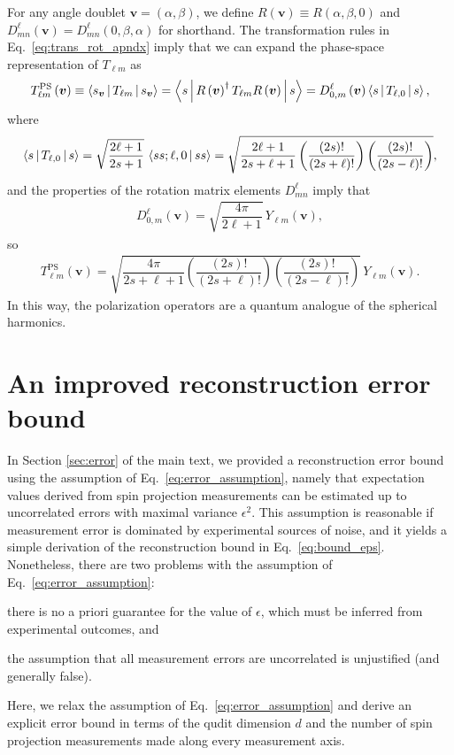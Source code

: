 \documentclass[nofootinbib,twocolumn]{revtex4-1}
\renewcommand{\t}{\text} %
\newcommand{\f}[2]{\dfrac{#1}{#2}} %
\newcommand{\p}[1]{\left(#1\right)} %
\newcommand{\bk}{\Braket} %
\begin{document}
For any angle doublet $\bm v=\p{\alpha,\beta}$, we define $R\p{\bm v}\equiv R\p{\alpha,\beta,0}$ and $D^\ell_{mn}\p{\bm v}=D^\ell_{mn}\p{0,\beta,\alpha}$ for shorthand.
The transformation rules in Eq.~\eqref{eq:trans_rot_apndx} imply that we can expand the phase-space representation of $T_{\ell m}$ as
\begin{align}
  T_{\ell m}^{\t{PS}}\p{\bm v}
  \equiv \bk{s_{\bm v} | T_{\ell m} | s_{\bm v}}
  = \bk{s | R\p{\bm v}^\dag T_{\ell m} R\p{\bm v} | s}
  = D^\ell_{0,m}\p{\bm v} \bk{s | T_{\ell,0} | s},
\end{align}
where
\begin{align}
  \bk{s | T_{\ell,0} | s}
  = \sqrt{\f{2\ell+1}{2s+1}} \, \bk{ss;\ell,0|ss}
  = \sqrt{\f{2\ell+1}{2s+\ell+1}
    \p{\f{\p{2s}!}{\p{2s+\ell}!}}
    \p{\f{\p{2s}!}{\p{2s-\ell}!}}},
\end{align}
and the properties of the rotation matrix elements $D^\ell_{mn}$ imply that
\begin{align}
  D^\ell_{0,m}\p{\bm v} = \sqrt{\f{4\pi}{2\ell+1}} \, Y_{\ell m}\p{\bm v},
\end{align}
so
\begin{align}
  T_{\ell m}^{\t{PS}}\p{\bm v}
  = \sqrt{\f{4\pi}{2s+\ell+1}
    \p{\f{\p{2s}!}{\p{2s+\ell}!}} \p{\f{\p{2s}!}{\p{2s-\ell}!}}} \,
  Y_{\ell m}\p{\bm v}.
\end{align}
In this way, the polarization operators are a quantum analogue of the spherical harmonics.

\section{An improved reconstruction error bound}
\label{sec:bound}

In Section \ref{sec:error} of the main text, we provided a reconstruction error bound using the assumption of Eq.~\eqref{eq:error_assumption}, namely that expectation values derived from spin projection measurements can be estimated up to uncorrelated errors with maximal variance $\epsilon^2$.
This assumption is reasonable if measurement error is dominated by experimental sources of noise, and it yields a simple derivation of the reconstruction bound in Eq.~\eqref{eq:bound_eps}.
Nonetheless, there are two problems with the assumption of Eq.~\eqref{eq:error_assumption}:
\begin{enumerate*}
\item there is no a priori guarantee for the value of $\epsilon$, which must be inferred from experimental outcomes, and
\item the assumption that all measurement errors are uncorrelated is unjustified (and generally false).
\end{enumerate*}
Here, we relax the assumption of Eq.~\eqref{eq:error_assumption} and derive an explicit error bound in terms of the qudit dimension $d$ and the number of spin projection measurements made along every measurement axis.
\end{document}
